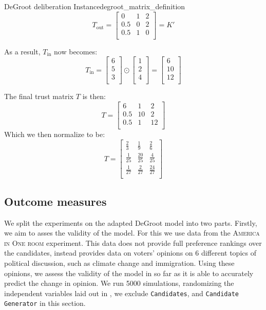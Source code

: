 \begin{example}{DeGroot deliberation Instance}{degroot_matrix_definition}
	$$T_{\text{out}} = \begin{bmatrix}
			0   & 1 & 2 \\
			0.5 & 0 & 2 \\
			0.5 & 1 & 0 \\
		\end{bmatrix} = K'$$

	As a result, $T_{\text{in}}$ now becomes:
	$$T_{\text{in}} = \begin{bmatrix}
			6 \\
			5 \\
			3 \\
		\end{bmatrix} \odot
		\begin{bmatrix}
			1 \\
			2 \\
			4 \\
		\end{bmatrix} = \begin{bmatrix}
			6  \\
			10 \\
			12 \\
		\end{bmatrix} $$

	The final trust matrix $T$ is then:
	$$T = \begin{bmatrix}
			6   & 1  & 2  \\
			0.5 & 10 & 2  \\
			0.5 & 1  & 12 \\
		\end{bmatrix}$$
	Which we then normalize to be:
	$$T = \begin{bmatrix}
			\frac{2}{3}  & \frac{1}{9}   & \frac{2}{6}   \\
			\frac{1}{25} & \frac{20}{25} & \frac{4}{25}  \\
			\frac{1}{27} & \frac{2}{27}  & \frac{24}{27} \\
		\end{bmatrix}
	$$

\end{example}

\subsection{Outcome measures}

We split the experiments on the adapted DeGroot model into two parts. Firstly, we aim to asses the validity of the model. For this we use
data from the \textsc{America in One room} experiment. This data does not provide full preference
rankings over the candidates, instead provides data on voters' opinions on 6
different topics of political discussion, such as climate change and
immigration. Using these opinions, we assess the validity of the model in so far as
it is able to accurately predict the change in opinion. We run 5000 simulations, randomizing the
independent variables laid out in , we exclude \texttt{Candidates}, and \texttt{Candidate Generator} in this section.

